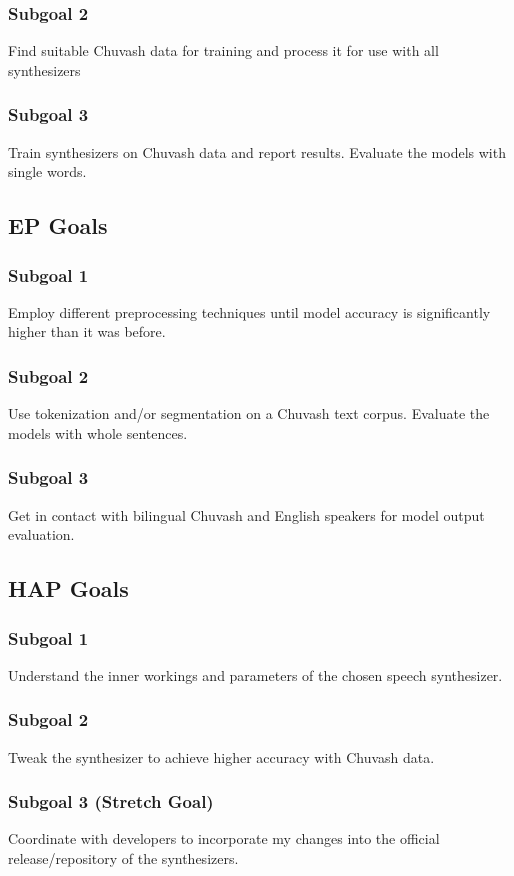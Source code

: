 \documentclass[fleqn,10pt]{SelfArx} %
\begin{document}
\subsubsection{Subgoal 2}
Find suitable Chuvash data for training and process it for use with all synthesizers
\subsubsection{Subgoal 3}
Train synthesizers on Chuvash data and report results. Evaluate the models with single words.

\subsection{EP Goals}
\subsubsection{Subgoal 1}
Employ different preprocessing techniques until model accuracy is significantly higher than it was before.
\subsubsection{Subgoal 2}
Use tokenization and/or segmentation on a Chuvash text corpus. Evaluate the models with whole sentences.
\subsubsection{Subgoal 3}
Get in contact with bilingual Chuvash and English speakers for model output evaluation.

\subsection{HAP Goals}
\subsubsection{Subgoal 1}
Understand the inner workings and parameters of the chosen speech synthesizer.
\subsubsection{Subgoal 2}
Tweak the synthesizer to achieve higher accuracy with Chuvash data.
\subsubsection{Subgoal 3 (Stretch Goal)}
Coordinate with developers to incorporate my changes into the official release/repository of the synthesizers.
\end{document}
